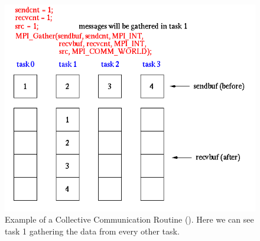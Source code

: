 \begin{figure}[H]
\centering
\includegraphics[width=.6\textwidth]{Parallelisation/Cluster/Img/MPI_Gather.png}
\caption[Example of a Collective Communication Routine (\cite{mpi_tuto}). ]{Example of a Collective Communication Routine (\cite{mpi_tuto}). Here we can see task 1 gathering the data from every other task.}
\label{fig:mpi_ccr}
\end{figure}